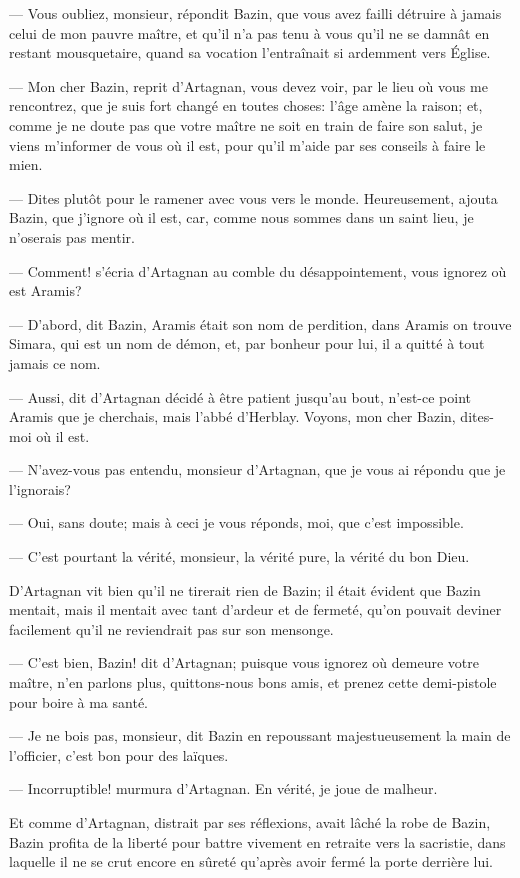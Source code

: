 — Vous oubliez, monsieur, répondit Bazin, que vous avez failli détruire à jamais celui de mon pauvre maître, et qu'il n'a pas tenu à vous qu'il ne se damnât en restant mousquetaire, quand sa vocation l'entraînait si ardemment vers Église.

— Mon cher Bazin, reprit d'Artagnan, vous devez voir, par le lieu où vous me rencontrez, que je suis fort changé en toutes choses: l'âge amène la raison; et, comme je ne doute pas que votre maître ne soit en train de faire son salut, je viens m'informer de vous où il est, pour qu'il m'aide par ses conseils à faire le mien.

— Dites plutôt pour le ramener avec vous vers le monde. Heureusement, ajouta Bazin, que j'ignore où il est, car, comme nous sommes dans un saint lieu, je n'oserais pas mentir.

— Comment! s'écria d'Artagnan au comble du désappointement, vous ignorez où est Aramis?

— D'abord, dit Bazin, Aramis était son nom de perdition, dans Aramis on trouve Simara, qui est un nom de démon, et, par bonheur pour lui, il a quitté à tout jamais ce nom.

— Aussi, dit d'Artagnan décidé à être patient jusqu'au bout, n'est-ce point Aramis que je cherchais, mais l'abbé d'Herblay. Voyons, mon cher Bazin, dites-moi où il est.

— N'avez-vous pas entendu, monsieur d'Artagnan, que je vous ai répondu que je l'ignorais?

— Oui, sans doute; mais à ceci je vous réponds, moi, que c'est impossible.

— C'est pourtant la vérité, monsieur, la vérité pure, la vérité du bon Dieu.

D'Artagnan vit bien qu'il ne tirerait rien de Bazin; il était évident que Bazin mentait, mais il mentait avec tant d'ardeur et de fermeté, qu'on pouvait deviner facilement qu'il ne reviendrait pas sur son mensonge.

— C'est bien, Bazin! dit d'Artagnan; puisque vous ignorez où demeure votre maître, n'en parlons plus, quittons-nous bons amis, et prenez cette demi-pistole pour boire à ma santé.

— Je ne bois pas, monsieur, dit Bazin en repoussant majestueusement la main de l'officier, c'est bon pour des laïques.

— Incorruptible! murmura d'Artagnan. En vérité, je joue de malheur.

Et comme d'Artagnan, distrait par ses réflexions, avait lâché la robe de Bazin, Bazin profita de la liberté pour battre vivement en retraite vers la sacristie, dans laquelle il ne se crut encore en sûreté qu'après avoir fermé la porte derrière lui.


